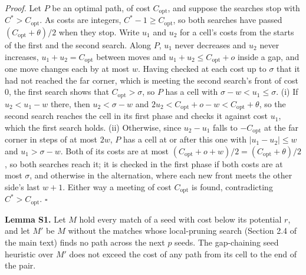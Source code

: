 \documentclass[10pt]{article}
\begin{document}
\emph{Proof.} Let \(P\) be an optimal path, of cost \(C_{\mathrm{opt}}\), and suppose the searches stop with \(C^* > C_{\mathrm{opt}}\). As costs are integers, \(C^* - 1 \ge C_{\mathrm{opt}}\), so both searches have passed \((C_{\mathrm{opt}}+\theta)/2\) when they stop. Write \(u_1\) and \(u_2\) for a cell's costs from the starts of the first and the second search. Along \(P\), \(u_1\) never decreases and \(u_2\) never increases, \(u_1 + u_2 = C_{\mathrm{opt}}\) between moves and \(u_1 + u_2 \le C_{\mathrm{opt}} + o\) inside a gap, and one move changes each by at most \(w\). Having checked at each cost up to \(\sigma\) that it had not reached the far corner, which is meeting the second search's front of cost 0, the first search shows that \(C_{\mathrm{opt}} > \sigma\), so \(P\) has a cell with \(\sigma - w < u_1 \le \sigma\). (i) If \(u_2 < u_1 - w\) there, then \(u_2 < \sigma - w\) and \(2u_2 < C_{\mathrm{opt}} + o - w < C_{\mathrm{opt}} + \theta\), so the second search reaches the cell in its first phase and checks it against cost \(u_1\), which the first search holds. (ii) Otherwise, since \(u_2 - u_1\) falls to \(-C_{\mathrm{opt}}\) at the far corner in steps of at most \(2w\), \(P\) has a cell at or after this one with \(|u_1 - u_2| \le w\) and \(u_1 > \sigma - w\). Both of its costs are at most \((C_{\mathrm{opt}} + o + w)/2 = (C_{\mathrm{opt}} + \theta)/2\), so both searches reach it; it is checked in the first phase if both costs are at most \(\sigma\), and otherwise in the alternation, where each new front meets the other side's last \(w + 1\). Either way a meeting of cost \(C_{\mathrm{opt}}\) is found, contradicting \(C^* > C_{\mathrm{opt}}\). \(\square\)

\textbf{Lemma S1.} Let \(M\) hold every match of a seed with cost below its potential \(r\), and let \(M'\) be \(M\) without the matches whose local-pruning search (Section 2.4 of the main text) finds no path across the next \(p\) seeds. The gap-chaining seed heuristic over \(M'\) does not exceed the cost of any path from its cell to the end of the pair.
\end{document}
